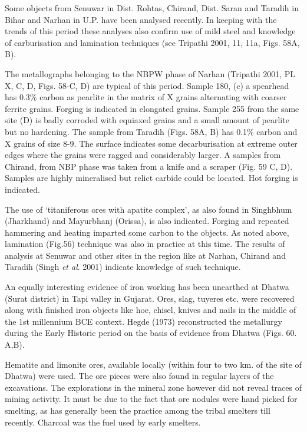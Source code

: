 Some objects from Senuwar in Dist. Rohtas, Chirand, Dist. Saran and Taradih in Bihar and Narhan in U.P. have been analysed recently. In keeping with the trends of this period these analyses also confirm use of mild steel and knowledge of carburisation and lamination techniques (see Tripathi 2001, 11, 11a, Figs. 58A, B).

The metallographs belonging to the NBPW phase of Narhan (Tripathi 2001, PL X, C, D, Figs. 58-C, D) are typical of this period. Sample 180, (c) a spearhead has 0.3\% carbon as pearlite in the matrix of X grains alternating with coarser ferrite grains. Forging is indicated in elongated grains. Sample 255 from the same site (D) is badly corroded with equiaxed grains and a small amount of pearlite but no hardening. The sample from Taradih (Figs. 58A, B) has 0.1\% carbon and X grains of size 8-9. The surface indicates some decarburisation at extreme outer edges where the grains were ragged and considerably larger. A samples from Chirand, from NBP phase was taken from a knife and a scraper (Fig. 59 C, D). Samples are highly mineralised but relict carbide could be located. Hot forging is indicated.

The use of ‘titaniferous ores with apatite complex’, as also found in Singhbhum (Jharkhand) and Mayurbhanj (Orissa), is also indicated. Forging and repeated hammering and heating imparted some carbon to the objects. As noted above, lamination (Fig.56) technique was also in practice at this time. The results of analysis at Senuwar and other sites in the region like at Narhan, Chirand and Taradih (Singh \textit{et al}. 2001) indicate knowledge of such technique.

An equally interesting evidence of iron working has been unearthed at Dhatwa (Surat district) in Tapi valley in Gujarat. Ores, slag, tuyeres etc. were recovered along with finished iron objects like hoe, chisel, knives and nails in the middle of the 1st millennium BCE context. Hegde (1973) reconstructed the metallurgy during the Early Historic period on the basis of evidence from Dhatwa (Figs. 60. A,B).

Hematite and limonite ores, available locally (within four to two km. of the site of Dhatwa) were used. The ore pieces were also found in regular layers of the excavations. The explorations in the mineral zone however did not reveal traces of mining activity. It must be due to the fact that ore nodules were hand picked for smelting, as has generally been the practice among the tribal smelters till recently. Charcoal was the fuel used by early smelters.

